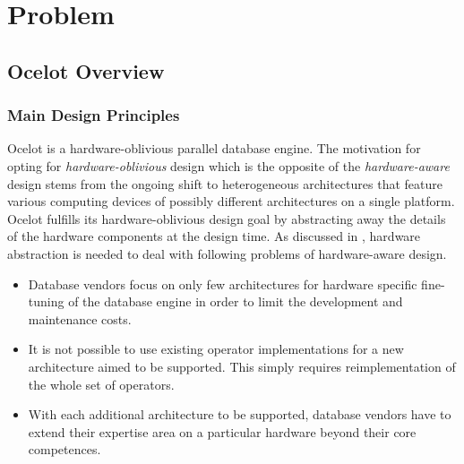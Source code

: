 
\chapter{Problem} %

\label{Chapter3} %


\section{Ocelot Overview}

\subsection{Main Design Principles}

Ocelot is a hardware-oblivious parallel database engine. The motivation for opting for \textit{hardware-oblivious} design which is the opposite of the \textit{hardware-aware} design stems from the ongoing shift to heterogeneous architectures that feature various computing devices of possibly different architectures on a single platform. Ocelot fulfills its hardware-oblivious design goal by abstracting away the details of the hardware components at the design time. As discussed in \citep[p. 710]{heimel_hardware-oblivious_2013}, hardware abstraction is needed to deal with following problems of hardware-aware design.

\begin{itemize}
\item{Database vendors focus on only few architectures for hardware specific fine-tuning of the database engine in order to limit the development and maintenance costs.}
\item{It is not possible to use existing operator implementations for a new architecture aimed to be supported. This simply requires reimplementation of the whole set of operators.}
\item{With each additional architecture to be supported, database vendors have to extend their expertise area on a particular hardware beyond their core competences.
}
\end{itemize}

